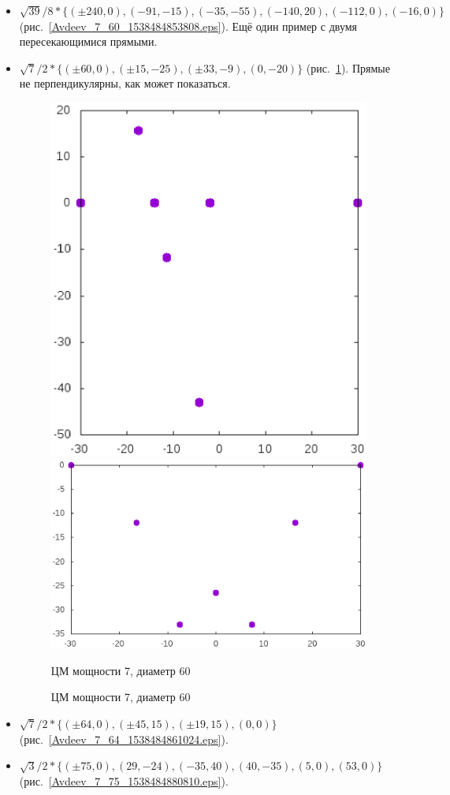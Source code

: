 \documentclass[12pt]{article}
\begin{document}
\begin{itemize}
\item
$
\sqrt{39}/8 *
\{
( \pm240 , 0),
( -91 , -15),
( -35 , -55),
( -140 , 20),
( -112 , 0),
( -16 , 0)
\}
$
(рис.~\ref{Avdeev_7_60_1538484853808.eps}).
Ещё один пример с двумя пересекающимися прямыми.

\item
$
\sqrt{7}/2 *
\{
( \pm60 , 0),
( \pm15 , -25),
( \pm33 , -9),
( 0 , -20)
\}
$
(рис.~\ref{Avdeev_7_60_1538484854748.eps}).
Прямые не перпендикулярны, как может показаться.

\begin{figure}[htbp]
	\includegraphics[width=.48\linewidth]{Avdeev_7_60_1538484853808.eps}
	\hfill
	\includegraphics[width=.48\linewidth]{Avdeev_7_60_1538484854748.eps}
	\\
	\parbox{.48\linewidth}{\caption{ЦМ мощности 7, диаметр 60}\label{Avdeev_7_60_1538484853808.eps}}
	\hfill
	\parbox{.48\linewidth}{\caption{ЦМ мощности 7, диаметр 60}\label{Avdeev_7_60_1538484854748.eps}}
\end{figure}

\item
$
\sqrt{7}/2 *
\{
( \pm64 , 0),
( \pm45 , 15),
( \pm19 , 15),
( 0 , 0)
\}
$
(рис.~\ref{Avdeev_7_64_1538484861024.eps}).

\item
$
\sqrt{3}/2 *
\{
( \pm75 , 0),
( 29 , -24),
( -35 , 40),
( 40 , -35),
( 5 , 0),
( 53 , 0)
\}
$
(рис.~\ref{Avdeev_7_75_1538484880810.eps}).



\end{itemize}
\end{document}
